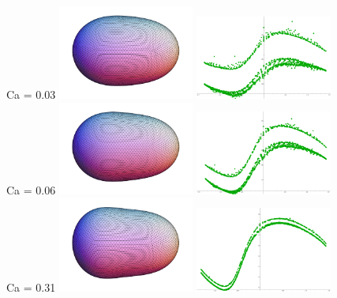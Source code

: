 \documentclass[12pt]{article}
\numberwithin{equation}{section}
\begin{document}
\pagebreak
\begin{figure}[h]
\begin{center}
	Ca = 0.03
	\includegraphics[width=0.4\textwidth]{shape/shape_vred95_conf90_v1eb20}
	\includegraphics[width=0.4\textwidth]{tension/tension_vred95_conf90_v1eb20}
	\\
	Ca = 0.06
	\includegraphics[width=0.4\textwidth]{shape/shape_vred95_conf90_v1eb10}
	\includegraphics[width=0.4\textwidth]{tension/tension_vred95_conf90_v1eb10}
	\\
	Ca = 0.31
	\includegraphics[width=0.4\textwidth]{shape/shape_vred95_conf90_v1eb2}
	\includegraphics[width=0.4\textwidth]{tension/tension_vred95_conf90_v1eb2}

\end{center}
\end{figure}
\end{document}
